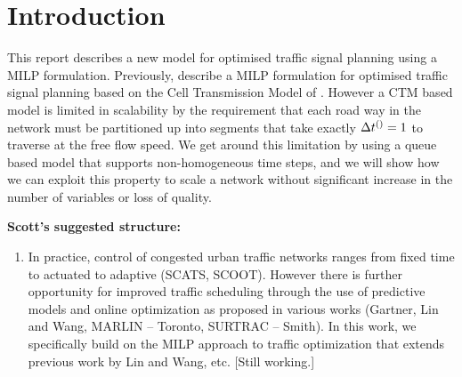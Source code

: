 \section{Introduction}

This report describes a new model for optimised traffic signal
planning using a MILP formulation. Previously,
 describe a MILP formulation for optimised
traffic signal planning based on the Cell Transmission Model of
. However a CTM based model is limited in
scalability by the requirement that each road way in the network must
be partitioned up into segments that take exactly $\DT[]=1$ to
traverse at the free flow speed. We get around this limitation by
using a queue based model that supports non-homogeneous time steps,
and we will show how we can exploit this property to scale a network
without significant increase in the number of variables or loss of
quality.

{\bf Scott's suggested structure:}
\begin{enumerate}
\item In practice, control of congested urban traffic networks ranges from fixed time to actuated to adaptive (SCATS, SCOOT).  However there is further opportunity for improved traffic scheduling through the use of predictive models and online optimization as proposed in various works (Gartner, Lin and Wang, MARLIN -- Toronto, SURTRAC -- Smith).  In this work, we specifically build on the MILP approach to traffic optimization that extends previous work by Lin and Wang, etc.  [Still working.]
\end{enumerate}
